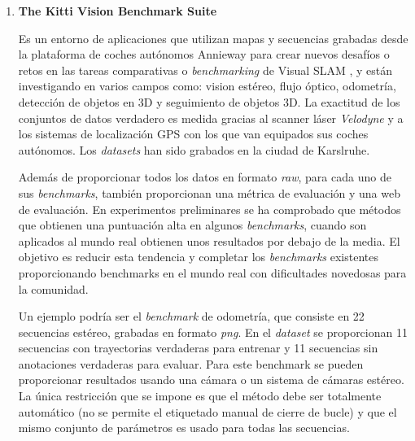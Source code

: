 \begin {enumerate}
SLAMBench está siendo una herramienta muy útil en robótica y Sistemas de Realidad Aumentada (AR). Aunque un gran número de algoritmos SLAM han sido presentados, no se ha investigado lo suficiente para tratar de unificar el interface de estos algoritmos, o realizar comparaciones de todas sus capacidades en conjunto. Esto presenta un problema ya que diferentes aplicaciones SLAM pueden tener diferentes requisitos funcionales y no funcionales. Por ejemplo, una solución para Realidad Aumentada desarrollada para móviles tendría que optimizar el consumo de energía, mientras que otra solución diseñada para vehículos de navegación autónoma estaría enfocada a funcionar con la mayor exactitud posible. SLAMBench2 es una herramienta de evaluación que compararía sistemas SLAM actuales y futuros, utilizando una lista extensible de \textit{datasets}, mientras utiliza una lista comparable de métricas de rendimiento. SLAMBench2 es un software que está disponible de manera pública.\footnote{https://github.com/pamela-project/slambench2} 

\item \textbf{The Kitti Vision Benchmark Suite }

Es un entorno de aplicaciones que utilizan mapas y secuencias grabadas desde la plataforma de coches autónomos Annieway \cite{AnnieWay08} para crear nuevos desafíos o retos en las tareas comparativas o \textit{benchmarking} de Visual SLAM \cite{Geiger2012CVPR}, y están investigando en varios campos como: vision estéreo, flujo óptico, odometría, detección de objetos en 3D y seguimiento de objetos 3D.
La exactitud de los conjuntos de datos verdadero es medida gracias al scanner láser \textit{Velodyne} y a los sistemas de localización GPS con los que van equipados sus coches autónomos.
Los \textit{datasets} han sido grabados en la ciudad de Karslruhe.

Además de proporcionar todos los datos en formato \textit{raw}, para cada uno de sus \textit{benchmarks}, también proporcionan una métrica de evaluación y una web de evaluación. En experimentos preliminares se ha comprobado que métodos que obtienen una puntuación alta en algunos \textit{benchmarks}, cuando son aplicados al mundo real obtienen unos resultados por debajo de la media. El objetivo es reducir esta tendencia y completar los \textit{benchmarks} existentes proporcionando benchmarks en el mundo real con dificultades novedosas para la comunidad. 

Un ejemplo podría ser el \textit{benchmark} de odometría, que consiste en 22 secuencias estéreo, grabadas en formato \textit{png}. En el \textit{dataset} se proporcionan 11 secuencias con trayectorias verdaderas para entrenar y 11 secuencias sin anotaciones verdaderas para evaluar. Para este benchmark se pueden proporcionar resultados usando una cámara o un sistema de cámaras estéreo.
La única restricción que se impone es que el método debe ser totalmente automático (no se permite el etiquetado manual de cierre de bucle) y que el mismo conjunto de parámetros es usado para todas las secuencias.


\end{enumerate}
